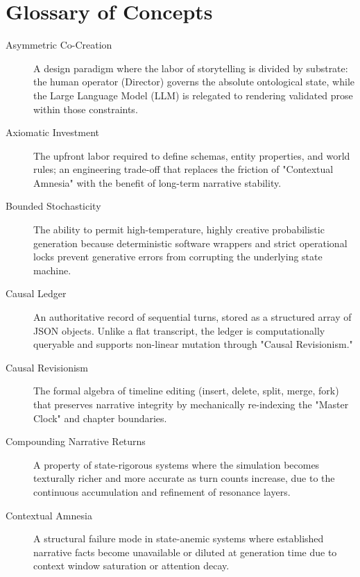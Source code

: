 \documentclass[12pt, a4paper]{article}
\begin{document}
\newpage
\section{Glossary of Concepts}
\label{app:glossary}

\begin{description}
    \item[Asymmetric Co-Creation] \label{def:asymmetric}
    A design paradigm where the labor of storytelling is divided by substrate: the human operator (Director) governs the absolute ontological state, while the Large Language Model (LLM) is relegated to rendering validated prose within those constraints.

    \item[Axiomatic Investment] \label{def:axiom}
    The upfront labor required to define schemas, entity properties, and world rules; an engineering trade-off that replaces the friction of "Contextual Amnesia" with the benefit of long-term narrative stability.

    \item[Bounded Stochasticity] \label{def:bounded}
    The ability to permit high-temperature, highly creative probabilistic generation because deterministic software wrappers and strict operational locks prevent generative errors from corrupting the underlying state machine.

    \item[Causal Ledger] \label{def:ledger}
    An authoritative record of sequential turns, stored as a structured array of JSON objects. Unlike a flat transcript, the ledger is computationally queryable and supports non-linear mutation through "Causal Revisionism."

    \item[Causal Revisionism] \label{def:surgery}
    The formal algebra of timeline editing (insert, delete, split, merge, fork) that preserves narrative integrity by mechanically re-indexing the "Master Clock" and chapter boundaries.

    \item[Compounding Narrative Returns] \label{def:compound}
    A property of state-rigorous systems where the simulation becomes texturally richer and more accurate as turn counts increase, due to the continuous accumulation and refinement of resonance layers.

    \item[Contextual Amnesia] \label{def:amnesia}
    A structural failure mode in state-anemic systems where established narrative facts become unavailable or diluted at generation time due to context window saturation or attention decay.


\end{description}
\end{document}
